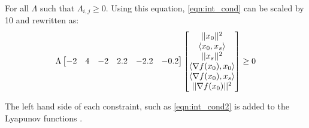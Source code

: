  For all $\Lambda $ such that $\Lambda_{i,j} \geq 0$. Using this equation, \ref{eqn:int_cond} can be scaled by 10 and rewritten as: \label{eqn:int_cond3}
\begin{equation} 
	\Lambda\begin{bmatrix}-2 & 4 & -2 & 2.2 & -2.2 & -0.2\end{bmatrix}\begin{bmatrix}||x_0||^2 \\ \langle x_0, x_s \rangle \\ ||x_s||^2 \\ \langle \nabla f(x_0), x_0 \rangle \\ \langle \nabla f(x_0), x_s \rangle \\ ||\nabla f(x_0)||^2\end{bmatrix} \geq 0
\end{equation}


	


The left hand side of each constraint, such as \ref{eqn:int_cond2} is added to the Lyapunov functions .

